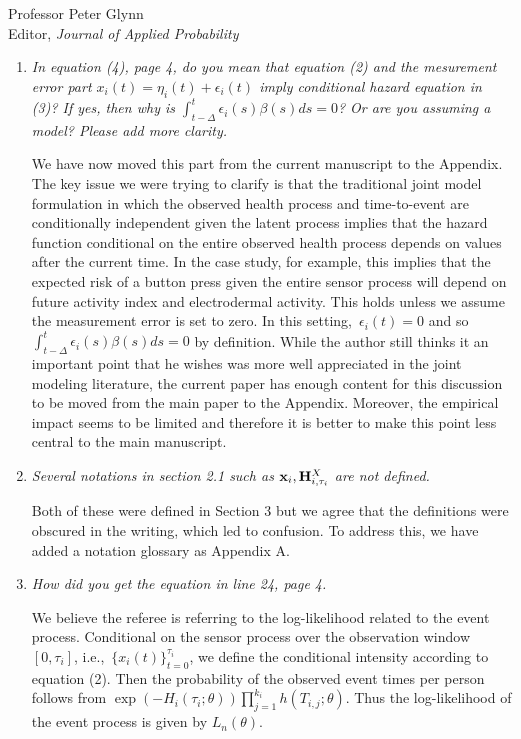 \documentclass[11pt]{letter} %
\begin{document}
\begin{letter}{Professor
	Peter Glynn\\
	Editor, {\em Journal of Applied Probability}}
\begin{enumerate}
\item {\it In equation (4), page 4, do you mean that equation (2) and the mesurement error part $x_i (t) = \eta_i (t) + \epsilon_i (t)$ imply conditional hazard equation in (3)?  If yes, then why is $\int_{t-\Delta}^t \epsilon_i (s) \beta(s) ds = 0$?  Or are you assuming a model?  Please add more clarity.}

\vspace{5mm}
We have now moved this part from the current manuscript to the Appendix. The key issue we were trying to clarify is that the traditional joint model formulation in which the observed health process and time-to-event are conditionally independent given the latent process implies that the hazard function conditional on the entire observed health process depends on values after the current time.  In the case study, for example, this implies that the expected risk of a button press given the entire sensor process will depend on future activity index and electrodermal activity.  This holds unless we assume the measurement error is set to zero.  In this setting,~$\epsilon_i (t) = 0$ and so $\int_{t-\Delta}^t \epsilon_i (s) \beta(s)ds = 0$ by definition. While the author still thinks it an important point that he wishes was more well appreciated in the joint modeling literature, the current paper has enough content for this discussion to be moved from the main paper to the Appendix.  Moreover, the empirical impact seems to be limited and therefore it is better to make this point less central to the main manuscript.
\vspace{5mm}

\item {\it Several notations in section 2.1 such as ${\bf x}_i, {\bf H}_{i,\tau_i}^X$ are not defined.}

\vspace{5mm}
Both of these were defined in Section 3 but we agree that the definitions were obscured in the writing, which led to confusion.  To address this, we have added a notation glossary as Appendix A.
\vspace{5mm}

\item {\it How did you get the equation in line 24, page 4.}

\vspace{5mm}
We believe the referee is referring to the log-likelihood related to the event process.   Conditional on the sensor process over the observation window $[0,\tau_i]$, i.e.,~$\{ x_i (t) \}_{t=0}^{\tau_i}$, we define the conditional intensity according to equation (2).  Then the probability of the observed event times per person follows from $\exp \left( - H_i (\tau_i ; \theta) \right) \prod_{j=1}^{k_i} h \left(T_{i,j};\theta \right)$.  Thus the log-likelihood of the event process is given by $L_n (\theta)$.
\vspace{5mm}


\end{enumerate}
\end{letter}
\end{document}

